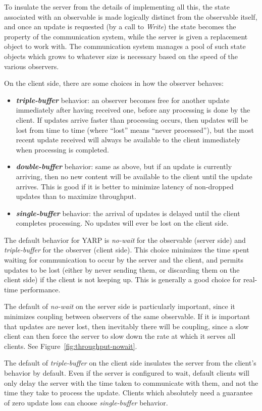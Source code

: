 \noindent
%
To insulate the server from the details of implementing all this, the
state associated with an observable is made logically distinct from
the observable itself, and once an update is requested (by a call to
{\em Write}) the state becomes the property of the communication
system, while the server is given a replacement object to work with.
%
The communication system manages a pool of such state objects which
grows to whatever size is necessary based on the speed of the various
observers.
%

On the client side, there are some choices in how the
observer behaves:

\begin{itemize} \pflist

\item \textbf{\textit{triple-buffer}} behavior: an observer becomes free for
another update immediately after having received one, before any
processing is done by the client.  If updates arrive faster than
processing occurs, then updates will be lost from time to time (where
``lost'' means ``never processed''), but the most recent update
received will always be available to the client immediately when processing
is completed.

\item \textbf{\textit{double-buffer}} behavior: same as above, but if
an update is currently arriving, then no new content will be available
to the client until the update arrives.  This is good if it is better
to minimize latency of non-dropped updates than to maximize
throughput.

\item \textbf{\textit{single-buffer}} behavior: the arrival of updates
is delayed until the client completes processing.  No updates will ever be 
lost on the client side.


\end{itemize}

\noindent The default behavior for YARP is \textit{no-wait} for
the observable (server side) and \textit{triple-buffer} for 
the observer (client side).  This
choice minimizes the time spent waiting for communication to occur by
the server and the client, and permits updates to be lost (either by
never sending them, or discarding them on the client side) if the
client is not keeping up.  This is generally a good choice for
real-time performance.

The default of \textit{no-wait} on the server side is particularly
important, since it minimizes coupling between observers of the same
observable.  If it is important that updates are never lost, then
inevitably there will be coupling, since a slow client can then force
the server to slow down the rate at which it serves all clients.
See Figure~\ref{fig:throughput-nowait}.

The default of \textit{triple-buffer} on the client side insulates the
server from the client's behavior by default.  Even if the server is
configured to wait, default clients will only delay the server
with the time taken to communicate with them, and not the time
they take to process the update.  Clients which absolutely
need a guarantee of zero update loss can choose \textit{single-buffer}
behavior.
%


